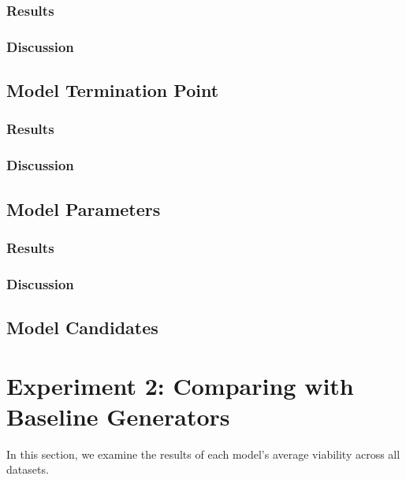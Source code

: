 \documentclass[12pt,a4paper]{report}
\begin{document}
\subsubsection{Results}

\subsubsection{Discussion}

\subsection{Model Termination Point}
\subsubsection{Results}

\subsubsection{Discussion}

\subsection{Model Parameters}
\subsubsection{Results}

\subsubsection{Discussion}

\subsection{Model Candidates}




\section{Experiment 2: Comparing with Baseline Generators}
\label{sec:experiment2}
In this section, we examine the results of each model's average viability across all datasets. 
\end{document}
